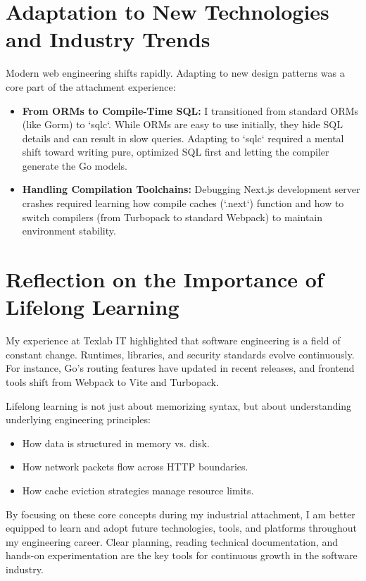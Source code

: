 \section{Adaptation to New Technologies and Industry Trends}
Modern web engineering shifts rapidly. Adapting to new design patterns was a core part of the attachment experience:
\begin{itemize}
    \item \textbf{From ORMs to Compile-Time SQL:} I transitioned from standard ORMs (like Gorm) to `sqlc`. While ORMs are easy to use initially, they hide SQL details and can result in slow queries. Adapting to `sqlc` required a mental shift toward writing pure, optimized SQL first and letting the compiler generate the Go models.
    \item \textbf{Handling Compilation Toolchains:} Debugging Next.js development server crashes required learning how compile caches (`.next`) function and how to switch compilers (from Turbopack to standard Webpack) to maintain environment stability.
\end{itemize}

\section{Reflection on the Importance of Lifelong Learning}
My experience at Texlab IT highlighted that software engineering is a field of constant change. Runtimes, libraries, and security standards evolve continuously. For instance, Go's routing features have updated in recent releases, and frontend tools shift from Webpack to Vite and Turbopack. 

Lifelong learning is not just about memorizing syntax, but about understanding underlying engineering principles:
\begin{itemize}
    \item How data is structured in memory vs. disk.
    \item How network packets flow across HTTP boundaries.
    \item How cache eviction strategies manage resource limits.
\end{itemize}
By focusing on these core concepts during my industrial attachment, I am better equipped to learn and adopt future technologies, tools, and platforms throughout my engineering career.
Clear planning, reading technical documentation, and hands-on experimentation are the key tools for continuous growth in the software industry.
